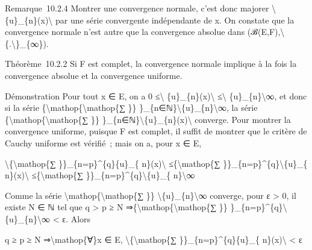\documentclass[]{article}
\begin{document}
Remarque~10.2.4 Montrer une convergence normale, c'est donc majorer
\textbackslash{}\textbar{}\{u\}\_\{n\}(x)\textbackslash{}\textbar{} par
une série convergente indépendante de x. On constate que la convergence
normale n'est autre que la convergence absolue dans
(ℬ(E,F),\textbackslash{}\textbar{}\{.\textbackslash{}\textbar{}\}\_\{∞\}).

Théorème~10.2.2 Si F est complet, la convergence normale implique à la
fois la convergence absolue et la convergence uniforme.

Démonstration Pour tout x ∈ E, on a 0 ≤\textbackslash{}\textbar{}
\{u\}\_\{n\}(x)\textbackslash{}\textbar{} ≤\textbackslash{}\textbar{}
\{u\}\_\{n\}\textbackslash{}\textbar{}∞, et donc si la série
\{\textbackslash{}mathop\{\textbackslash{}mathop\{∑ \}\}
\}\_\{n∈ℕ\}\textbackslash{}\textbar{}\{u\}\_\{n\}\textbackslash{}\textbar{}∞,
la série \{\textbackslash{}mathop\{\textbackslash{}mathop\{∑ \}\}
\}\_\{n∈ℕ\}\textbackslash{}\textbar{}\{u\}\_\{n\}(x)\textbackslash{}\textbar{}
converge. Pour montrer la convergence uniforme, puisque F est complet,
il suffit de montrer que le critère de Cauchy uniforme est vérifié~;
mais on a, pour x ∈ E,

\textbackslash{}\textbar{}\{\textbackslash{}mathop\{∑
\}\}\_\{n=p\}\^{}\{q\}\{u\}\_\{ n\}(x)\textbackslash{}\textbar{}
≤\{\textbackslash{}mathop\{∑
\}\}\_\{n=p\}\^{}\{q\}\textbackslash{}\textbar{}\{u\}\_\{
n\}(x)\textbackslash{}\textbar{} ≤\{\textbackslash{}mathop\{∑
\}\}\_\{n=p\}\^{}\{q\}\textbackslash{}\textbar{}\{u\}\_\{
n\}\textbackslash{}\textbar{}∞

Comme la série \textbackslash{}mathop\{\textbackslash{}mathop\{∑ \}\}
\textbackslash{}\textbar{}\{u\}\_\{n\}\textbackslash{}\textbar{}∞
converge, pour ε \textgreater{} 0, il existe N ∈ ℕ tel que q
\textgreater{} p ≥ N
⇒\{\textbackslash{}mathop\{\textbackslash{}mathop\{∑ \}\}
\}\_\{n=p\}\^{}\{q\}\textbackslash{}\textbar{}\{u\}\_\{n\}\textbackslash{}\textbar{}∞
\textless{} ε. Alors

q ≥ p ≥ N ⇒\textbackslash{}mathop\{∀\}x ∈ E,
\textbackslash{}\textbar{}\{\textbackslash{}mathop\{∑
\}\}\_\{n=p\}\^{}\{q\}\{u\}\_\{ n\}(x)\textbackslash{}\textbar{}
\textless{} ε
\end{document}
